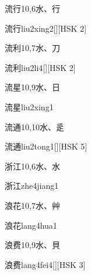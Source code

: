 \begin{entry}{流行}{10,6}{⽔、⾏}
  \begin{phonetics}{流行}{liu2xing2}[][HSK 2]
  \end{phonetics}
\end{entry}

\begin{entry}{流利}{10,7}{⽔、⼑}
  \begin{phonetics}{流利}{liu2li4}[][HSK 2]
  \end{phonetics}
\end{entry}

\begin{entry}{流星}{10,9}{⽔、⽇}
  \begin{phonetics}{流星}{liu2xing1}
  \end{phonetics}
\end{entry}

\begin{entry}{流通}{10,10}{⽔、⾡}
  \begin{phonetics}{流通}{liu2tong1}[][HSK 5]
  \end{phonetics}
\end{entry}

\begin{entry}{浙江}{10,6}{⽔、⽔}
  \begin{phonetics}{浙江}{zhe4jiang1}
  \end{phonetics}
\end{entry}

\begin{entry}{浪花}{10,7}{⽔、⾋}
  \begin{phonetics}{浪花}{lang4hua1}
  \end{phonetics}
\end{entry}

\begin{entry}{浪费}{10,9}{⽔、⾙}
  \begin{phonetics}{浪费}{lang4fei4}[][HSK 3]
  \end{phonetics}
\end{entry}

